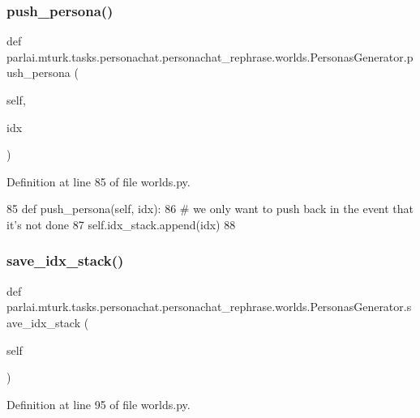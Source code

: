 \subsubsection{\texorpdfstring{push\+\_\+persona()}{push\_persona()}}
{\footnotesize\ttfamily def parlai.\+mturk.\+tasks.\+personachat.\+personachat\+\_\+rephrase.\+worlds.\+Personas\+Generator.\+push\+\_\+persona (\begin{DoxyParamCaption}\item[{}]{self,  }\item[{}]{idx }\end{DoxyParamCaption})}



Definition at line 85 of file worlds.\+py.


\begin{DoxyCode}
85     \textcolor{keyword}{def }push\_persona(self, idx):
86         \textcolor{comment}{# we only want to push back in the event that it's not done}
87         self.idx\_stack.append(idx)
88 
\end{DoxyCode}
\mbox{\label{classparlai_1_1mturk_1_1tasks_1_1personachat_1_1personachat__rephrase_1_1worlds_1_1PersonasGenerator_afb148eb1f60598db4637faabd8a077f1}} 
\subsubsection{\texorpdfstring{save\+\_\+idx\+\_\+stack()}{save\_idx\_stack()}}
{\footnotesize\ttfamily def parlai.\+mturk.\+tasks.\+personachat.\+personachat\+\_\+rephrase.\+worlds.\+Personas\+Generator.\+save\+\_\+idx\+\_\+stack (\begin{DoxyParamCaption}\item[{}]{self }\end{DoxyParamCaption})}



Definition at line 95 of file worlds.\+py.



